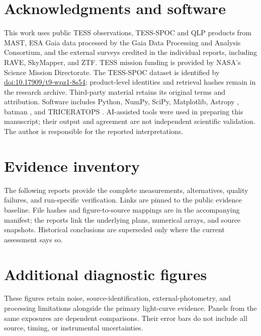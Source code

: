 \documentclass[11pt]{article}
\begin{document}
\section*{Acknowledgments and software}
This work uses public TESS observations, TESS-SPOC and QLP products from MAST, ESA Gaia data processed by the Gaia Data Processing and Analysis Consortium, and the external surveys credited in the individual reports, including RAVE, SkyMapper, and ZTF. TESS mission funding is provided by NASA's Science Mission Directorate. The TESS-SPOC dataset is identified by \href{https://doi.org/10.17909/t9-wpz1-8s54}{doi:10.17909/t9-wpz1-8s54}; product-level identities and retrieval hashes remain in the research archive. Third-party material retains its original terms and attribution. Software includes Python, NumPy, SciPy, Matplotlib, Astropy \citep{astropy2022}, batman \citep{kreidberg2015}, and TRICERATOPS \citep{giacalone2021}. AI-assisted tools were used in preparing this manuscript; their output and agreement are not independent scientific validation. The author is responsible for the reported interpretations.

\clearpage


\clearpage
\appendix
\section{Evidence inventory}\label{app:evidence}
The following reports provide the complete measurements, alternatives, quality failures, and run-specific verification. Links are pinned to the public evidence baseline. File hashes and figure-to-source mappings are in the accompanying manifest; the reports link the underlying plans, numerical arrays, and source snapshots. Historical conclusions are superseded only where the current assessment says so.


\clearpage
\section{Additional diagnostic figures}\label{app:figures}
These figures retain noise, source-identification, external-photometry, and processing limitations alongside the primary light-curve evidence. Panels from the same exposures are dependent comparisons. Their error bars do not include all source, timing, or instrumental uncertainties.

\end{document}
